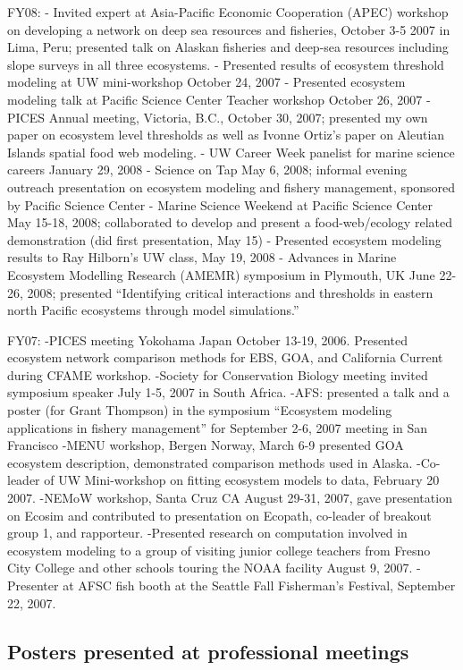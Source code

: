 \documentclass[11pt, a4paper]{awesome-cv}
\begin{document}
FY08: - Invited expert at Asia-Pacific Economic Cooperation (APEC)
workshop on developing a network on deep sea resources and fisheries,
October 3-5 2007 in Lima, Peru; presented talk on Alaskan fisheries and
deep-sea resources including slope surveys in all three ecosystems. -
Presented results of ecosystem threshold modeling at UW mini-workshop
October 24, 2007 - Presented ecosystem modeling talk at Pacific Science
Center Teacher workshop October 26, 2007 - PICES Annual meeting,
Victoria, B.C., October 30, 2007; presented my own paper on ecosystem
level thresholds as well as Ivonne Ortiz's paper on Aleutian Islands
spatial food web modeling. - UW Career Week panelist for marine science
careers January 29, 2008 - Science on Tap May 6, 2008; informal evening
outreach presentation on ecosystem modeling and fishery management,
sponsored by Pacific Science Center - Marine Science Weekend at Pacific
Science Center May 15-18, 2008; collaborated to develop and present a
food-web/ecology related demonstration (did first presentation, May 15)
- Presented ecosystem modeling results to Ray Hilborn's UW class, May
19, 2008 - Advances in Marine Ecosystem Modelling Research (AMEMR)
symposium in Plymouth, UK June 22-26, 2008; presented ``Identifying
critical interactions and thresholds in eastern north Pacific ecosystems
through model simulations.''

FY07: -PICES meeting Yokohama Japan October 13-19, 2006. Presented
ecosystem network comparison methods for EBS, GOA, and California
Current during CFAME workshop. -Society for Conservation Biology meeting
invited symposium speaker July 1-5, 2007 in South Africa. -AFS:
presented a talk and a poster (for Grant Thompson) in the symposium
``Ecosystem modeling applications in fishery management'' for September
2-6, 2007 meeting in San Francisco -MENU workshop, Bergen Norway, March
6-9 presented GOA ecosystem description, demonstrated comparison methods
used in Alaska. -Co-leader of UW Mini-workshop on fitting ecosystem
models to data, February 20 2007. -NEMoW workshop, Santa Cruz CA August
29-31, 2007, gave presentation on Ecosim and contributed to presentation
on Ecopath, co-leader of breakout group 1, and rapporteur. -Presented
research on computation involved in ecosystem modeling to a group of
visiting junior college teachers from Fresno City College and other
schools touring the NOAA facility August 9, 2007. -Presenter at AFSC
fish booth at the Seattle Fall Fisherman's Festival, September 22, 2007.

\hypertarget{posters-presented-at-professional-meetings}{%
\subsection{Posters presented at professional
meetings}\label{posters-presented-at-professional-meetings}}
\end{document}
